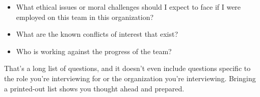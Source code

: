\begin{itemize}
    \item What ethical issues or moral challenges should I expect to face if I were employed on this team in this organization?
    \item What are the known conflicts of interest that exist?

    \item Who is working against the progress of the team?
    
\end{itemize}

That's a long list of questions, and it doesn't even include questions specific to the role you're interviewing for or the organization you're interviewing. Bringing a printed-out list shows you thought ahead and prepared. 

